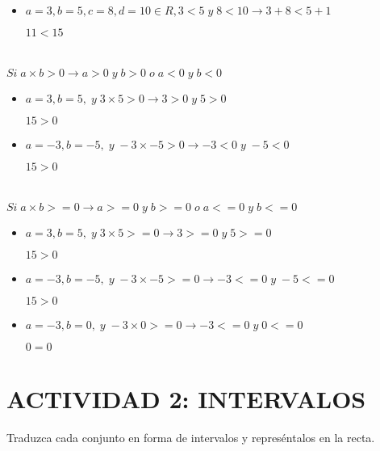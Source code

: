 \documentclass[12pt, letterpaper, twoside]{article}
\begin{document}
\begin{itemize}
    \item $a = 3, b = 5, c = 8, d = 10 \in R, 3 < 5 \;y\; 8 < 10 \to 3 + 8 < 5 + 1$
    
    $ 11 < 15$
\end{itemize}

\section{}

$Si \; a \times b > 0 \to a > 0 \;y\; b > 0 \; o \; a < 0 \;y\; b < 0$

\begin{itemize}
    \item $a = 3, b = 5, \;y\; 3 \times 5 > 0 \to 3 > 0 \;y\; 5 > 0$
    
    $15 > 0$

    \item $a = -3, b = -5, \;y\; -3 \times -5 > 0 \to -3 < 0 \;y\; -5 < 0$
    
    $15 > 0$
\end{itemize}

\section{}

$Si \; a \times b >= 0 \to a >= 0 \;y\; b >= 0 \; o \; a <= 0 \;y\; b <= 0$

\begin{itemize}
    \item $a = 3, b = 5, \;y\; 3 \times 5 >= 0 \to 3 >= 0 \;y\; 5 >= 0$
    
    $15 > 0$

    \item $a = -3, b = -5, \;y\; -3 \times -5 >= 0 \to -3 <= 0 \;y\; -5 <= 0$
    
    $15 > 0$

    \item $a = -3, b = 0, \;y\; -3 \times 0 >= 0 \to -3 <= 0 \;y\; 0 <= 0$
    
    $0 = 0$


\end{itemize}


\section*{ACTIVIDAD 2: INTERVALOS}

Traduzca cada conjunto en forma de intervalos y represéntalos en la recta.
\end{document}
